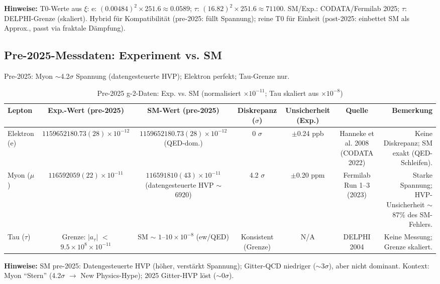 \documentclass[12pt,a4paper]{article}
\begin{document}
	\textbf{Hinweise:} T0-Werte aus $\xi$: e: $(0.00484)^2 \times 251.6 \approx 0.0589$; $\tau$: $(16.82)^2 \times 251.6 \approx 71100$. SM/Exp.: CODATA/Fermilab 2025; $\tau$: DELPHI-Grenze (skaliert). Hybrid für Kompatibilität (pre-2025: füllt Spannung); reine T0 für Einheit (post-2025: einbettet SM als Approx., passt via fraktale Dämpfung).
	
	\subsection{Pre-2025-Messdaten: Experiment vs. SM}
	
	Pre-2025: Myon $\sim$4.2$\sigma$ Spannung (datengesteuerte HVP); Elektron perfekt; Tau-Grenze nur.
	
	\begin{table}[ht!]
		\centering
		\small
		\begin{adjustbox}{max width=\textwidth}
			\begin{tabular}{lcccccr}
				\toprule
				Lepton & Exp.-Wert (pre-2025) & SM-Wert (pre-2025) & Diskrepanz ($\sigma$) & Unsicherheit (Exp.) & Quelle & Bemerkung \\
				\midrule
				Elektron (e) & $1159652180.73(28) \times 10^{-12}$ & $1159652180.73(28) \times 10^{-12}$ (QED-dom.) & 0 $\sigma$ & $\pm$0.24 ppb & Hanneke et al. 2008 (CODATA 2022) & Keine Diskrepanz; SM exakt (QED-Schleifen). \\
				Myon ($\mu$) & $116592059(22) \times 10^{-11}$ & $116591810(43) \times 10^{-11}$ (datengesteuerte HVP $\sim$6920) & 4.2 $\sigma$ & $\pm$0.20 ppm & Fermilab Run 1--3 (2023) & Starke Spannung; HVP-Unsicherheit $\sim$87\% des SM-Fehlers. \\
				Tau ($\tau$) & Grenze: $|a_\tau|$ $<$ $9.5 \times 10^{8} \times 10^{-11}$ & SM $\sim$ $1$--$10 \times 10^{-8}$ (ew/QED) & Konsistent (Grenze) & N/A & DELPHI 2004 & Keine Messung; Grenze skaliert. \\
				\bottomrule
			\end{tabular}
		\end{adjustbox}
		\caption{Pre-2025 g-2-Daten: Exp. vs. SM (normalisiert $ \times 10^{-11}$; Tau skaliert aus $ \times 10^{-8}$)}
		\label{tab:pre2025}
	\end{table}
	
	\textbf{Hinweise:} SM pre-2025: Datengesteuerte HVP (höher, verstärkt Spannung); Gitter-QCD niedriger ($\sim$3$\sigma$), aber nicht dominant. Kontext: Myon ``Stern'' (4.2$\sigma$ $\to$ New Physics-Hype); 2025 Gitter-HVP löst ($\sim$0$\sigma$).
	
\end{document}
